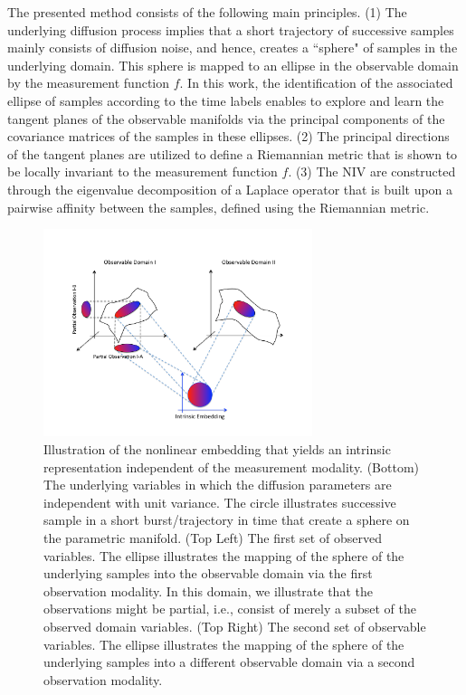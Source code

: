 \documentclass[aip,jcp,reprint,twocolumn]{revtex4-1}
\begin{document}
The presented method consists of the following main principles. 
%
(1) The underlying diffusion process implies that a short trajectory of successive samples mainly consists of diffusion noise, and hence, creates a ``sphere" of samples in the underlying domain. 
%
This sphere is mapped to an ellipse in the observable domain by the measurement function $f$. 
%
In this work, the identification of the associated ellipse of samples according to the time labels enables to explore and learn the tangent planes of the observable manifolds via the principal components of the covariance matrices of the samples in these ellipses. 
%
(2) The principal directions of the tangent planes are utilized to define a Riemannian metric that is shown to be locally invariant to the measurement function $f$. 
%
(3) The NIV are constructed through the eigenvalue decomposition of a Laplace operator that is built upon a pairwise affinity between the samples, defined using the Riemannian metric.

\begin{figure}[ht]
\includegraphics[width=0.7\textwidth]{IntrinsicEmbeddingIllustration2}
\caption{Illustration of the nonlinear embedding that yields an intrinsic representation independent of the measurement modality. (Bottom) The underlying variables in which the diffusion parameters are independent with unit variance. The circle illustrates successive sample in a short burst/trajectory in time that create a sphere on the parametric manifold. (Top Left) The first set of observed variables. The ellipse illustrates the mapping of the sphere of the underlying samples into the observable domain via the first observation modality. In this domain, we illustrate that the observations might be partial, i.e., consist of merely a subset of the observed domain variables. (Top Right) The second set of observable variables. The ellipse illustrates the mapping of the sphere of the underlying samples into a different observable domain via a second observation modality.}
\label{fig:IntrinsicIllustration}
\end{figure}
\end{document}
